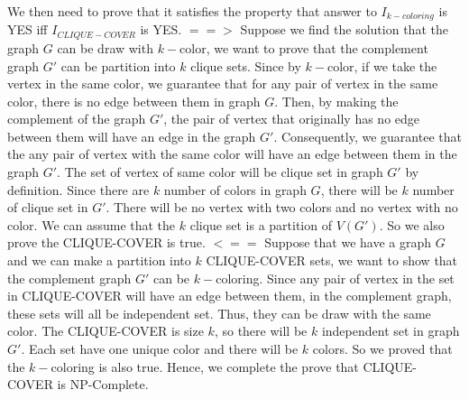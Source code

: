 \documentclass[11pt]{article}
\begin{document}
\begin{solution}
\begin{enumerate}
\begin{itemize}
            \end{itemize}
        We then need to prove that it satisfies the property that answer to $I_{k-coloring}$ is YES iff $I_{CLIQUE-COVER}$ is YES.
        \newline
        \newline
        $==>$
        \newline
        Suppose we find the solution that the graph $G$ can be draw with $k-$color, we want to prove that the complement graph $G'$ can be partition into $k$ clique sets. Since by $k-$color, if we take the vertex in the same color, we guarantee that for any pair of vertex in the same color, there is no edge between them in graph $G$. Then, by making the complement of the graph $G'$, the pair of vertex that originally has no edge between them will have an edge in the graph $G'$. Consequently, we guarantee that the any pair of vertex with the same color will have an edge between them in the graph $G'$. The set of vertex of same color will be clique set in graph $G'$ by definition. Since there are $k$ number of colors in graph $G$, there will be $k$ number of clique set in $G'$. There will be no vertex with two colors and no vertex with no color. We can assume that the $k$ clique set is a partition of $V(G')$. So we also prove the CLIQUE-COVER is true.
        \newline
        \newline
        $<==$
        \newline
        Suppose that we have a graph $G$ and we can make a partition into $k$ CLIQUE-COVER sets, we want to show that the complement graph $G'$ can be $k-$coloring. Since any pair of vertex in the set in CLIQUE-COVER will have an edge between them, in the complement graph, these sets will all be independent set. Thus, they can be draw with the same color. The CLIQUE-COVER is size $k$, so there will be $k$ independent set in graph $G'$. Each set have one unique color and there will be $k$ colors. So we proved that the $k-$coloring is also true. 
        \newline
        \newline
        Hence, we complete the prove that CLIQUE-COVER is NP-Complete.
\end{enumerate}
\end{solution}
\end{document}
